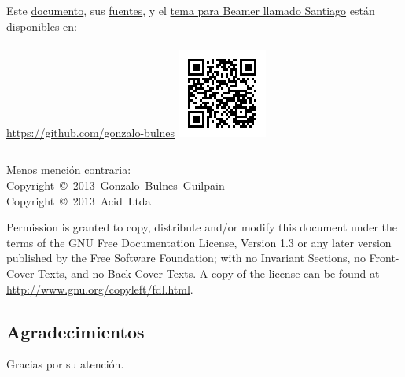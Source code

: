   \begin{frame}{\insertsubsection}

    \footnotesize
      \begin{columns}
          Este \href{https://github.com/gonzalo-bulnes/introduction-to-tests}{documento}, sus \href{hhttps://github.com/gonzalo-bulnes/introduction-to-tests}{fuentes}, y el \href{https://github.com/gonzalo-bulnes/santiago-beamer-theme}{tema para Beamer llamado Santiago} están disponibles en:\\~\\
          \url{https://github.com/gonzalo-bulnes}
        \hfill\includegraphics[width=\textwidth]{../../src/images/sources-talk.png}
      \end{columns}
    \normalsize

    \scriptsize{Menos mención contraria:}\\
    \noindent\scriptsize{Copyright~\copyright~2013~Gonzalo~Bulnes~Guilpain}\\
    \noindent\scriptsize{Copyright~\copyright~2013~Acid~Ltda}

    \scriptsize{Permission is granted to copy, distribute and/or modify this document
    under the terms of the GNU Free Documentation License, Version 1.3
    or any later version published by the Free Software Foundation;
    with no Invariant Sections, no Front-Cover Texts, and no Back-Cover Texts.
    A copy of the license can be found at \url{http://www.gnu.org/copyleft/fdl.html}.}
  \end{frame}

%
\subsection{Agradecimientos}

  \begin{frame}
    \vspace{0mm}
    \begin{center}
      Gracias por su atención.
    \end{center}
  \end{frame}

